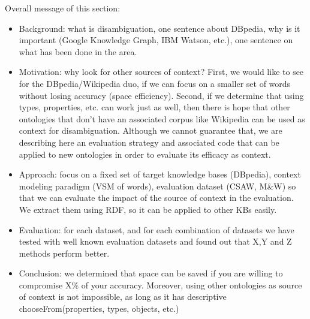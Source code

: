 \documentclass[10pt,a4paper]{article}
\begin{document}
Overall message of this section:
\begin{itemize}
\item Background: what is disambiguation, one sentence about DBpedia, why is it important (Google Knowledge Graph, IBM Watson, etc.), one sentence on what has been done in the area. 
\item Motivation: why look for other sources of context? First, we would like to see for the DBpedia/Wikipedia duo, if we can focus on a smaller set of words without losing accuracy (space efficiency). Second, if we determine that using types, properties, etc. can work just as well, then there is hope that other ontologies that don't have an associated corpus like Wikipedia can be used as context for disambiguation. Although we cannot guarantee that, we are describing here an evaluation strategy and associated code that can be applied to new ontologies in order to evaluate its efficacy as context.
\item Approach: focus on a fixed set of target knowledge bases (DBpedia), context modeling paradigm (VSM of words), evaluation dataset (CSAW, M\&W) so that we can evaluate the impact of the source of context in the evaluation. We extract them using RDF, so it can be applied to other KBs easily.
\item Evaluation: for each dataset, and for each combination of datasets we have tested with well known evaluation datasets and found out that X,Y and Z methods perform better.
\item Conclusion: we determined that space can be saved if you are willing to compromise X\% of your accuracy. Moreover, using other ontologies as source of context is not impossible, as long as it has descriptive chooseFrom(properties, types, objects, etc.)
\end{itemize}

\end{document}
